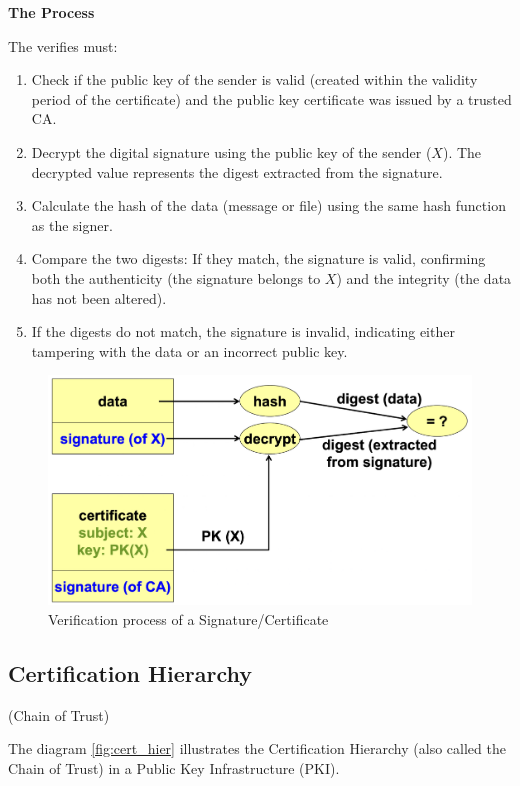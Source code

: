 \begin{center}
    \textbf{The Process}
\end{center}
The verifies must:
\begin{enumerate}
    \item Check if the public key of the sender is valid (created within the validity period of the certificate) and the public key certificate was issued by a trusted CA.
    \item Decrypt the digital signature using the public key of the sender ($X$). The decrypted value represents the digest extracted from the signature.
    \item Calculate the hash of the data (message or file) using the same hash function as the signer.
    \item Compare the two digests: If they match, the signature is valid, confirming both the authenticity (the signature belongs to $X$) and the integrity (the data has not been altered).
    \item If the digests do not match, the signature is invalid, indicating either tampering with the data or an incorrect public key.
    \end{enumerate}
\begin{figure}[H]
    \centering
    \includegraphics[width=0.5\linewidth]{Images/Cryptography/cert_verif.png}
    \caption{Verification process of a Signature/Certificate}
\end{figure}

\subsection{Certification Hierarchy}
\begin{center}
    (Chain of Trust)
\end{center}
The diagram \ref{fig:cert_hier} illustrates the Certification Hierarchy (also called the Chain of Trust) in a Public Key Infrastructure (PKI).

\hfill


